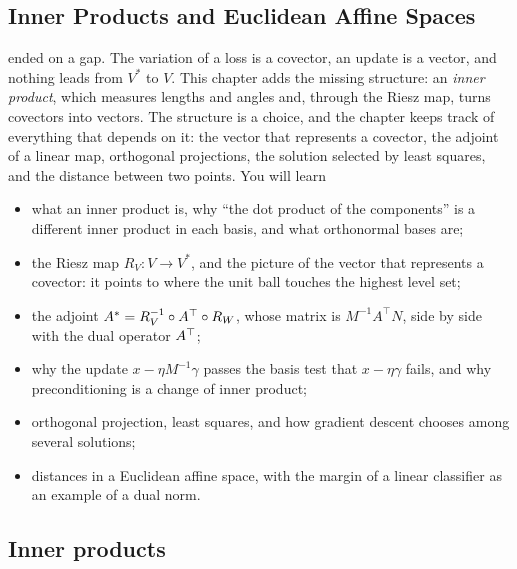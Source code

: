 \begin{notechapter}
\chapter{Inner Products and Euclidean Affine Spaces}
\label{ch:inner-products}

\begin{chapterintro}
 ended on a gap. The variation of a loss is a covector, an
update is a vector, and nothing leads from $V^*$ to $V$. This chapter adds
the missing structure: an \emph{inner product}, which measures lengths and
angles and, through the Riesz map, turns covectors into vectors. The
structure is a choice, and the chapter keeps track of everything that
depends on it: the vector that represents a covector, the adjoint of a
linear map, orthogonal projections, the solution selected by least
squares, and the distance between two points. You will learn
\begin{itemize}[nosep]
  \item what an inner product is, why ``the dot product of the components''
        is a different inner product in each basis, and what orthonormal
        bases are;
  \item the Riesz map $R_V:V\to V^*$, and the picture of the vector that
        represents a covector: it points to where the unit ball touches the
        highest level set;
  \item the adjoint $A^{*} = R_V^{-1}\circ A^{\top}\circ R_W$, whose matrix is
        $M^{-1}A^\top N$, side by side with the dual operator $A^{\top}$;
  \item why the update $x - \eta M^{-1}\gamma$ passes the basis test that
        $x - \eta\gamma$ fails, and why preconditioning is a change of
        inner product;
  \item orthogonal projection, least squares, and how gradient descent
        chooses among several solutions;
  \item distances in a Euclidean affine space, with the margin of a linear
        classifier as an example of a dual norm.
\end{itemize}
\end{chapterintro}

\section{Inner products}\label{inner-products:sec:definition}


\end{notechapter}
